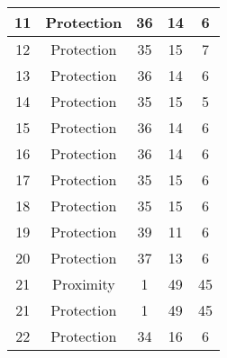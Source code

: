 \documentclass[results.tex]{subfiles}
\begin{document}
\begin{center}
\begin{tabular}{| c || c | c | c | c |}
            \hline
            11                      & Protection                   & 36                     & 14                      & 6                    \\
            \hline
            12                      & Protection                   & 35                     & 15                      & 7                    \\
            \hline
            13                      & Protection                   & 36                     & 14                      & 6                    \\
            \hline
            14                      & Protection                   & 35                     & 15                      & 5                    \\
            \hline
            15                      & Protection                   & 36                     & 14                      & 6                    \\
            \hline
            16                      & Protection                   & 36                     & 14                      & 6                    \\
            \hline
            17                      & Protection                   & 35                     & 15                      & 6                    \\
            \hline
            18                      & Protection                   & 35                     & 15                      & 6                    \\
            \hline
            19                      & Protection                   & 39                     & 11                      & 6                    \\
            \hline
            20                      & Protection                   & 37                     & 13                      & 6                    \\
            \hline
            21                      & Proximity                    & 1                      & 49                      & 45                   \\
            \hline
            21                      & Protection                   & 1                      & 49                      & 45                   \\
            \hline
            22                      & Protection                   & 34                     & 16                      & 6                    \\

\end{tabular}
\end{center}
\end{document}
